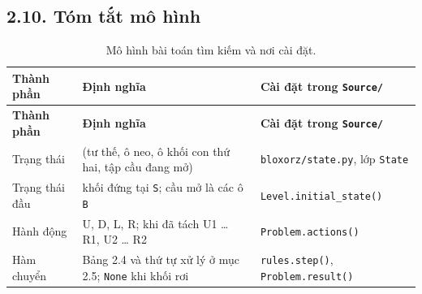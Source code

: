 \subsection{2.10. Tóm tắt mô hình}


\begin{longtable}[]{@{}
  >{\raggedright\arraybackslash}p{}
  >{\raggedright\arraybackslash}p{}
  >{\raggedright\arraybackslash}p{}@{}}
\caption{ Mô hình bài toán tìm kiếm và nơi cài đặt.}\tabularnewline
\toprule\noalign{}
\rowcolor{tablehead}\begin{minipage}[b]{\linewidth}\raggedright
\textbf{Thành phần}
\end{minipage} & \begin{minipage}[b]{\linewidth}\raggedright
\textbf{Định nghĩa}
\end{minipage} & \begin{minipage}[b]{\linewidth}\raggedright
\textbf{Cài đặt trong \texttt{Source/\allowbreak{}}}
\end{minipage} \\
\midrule\noalign{}
\endfirsthead
\toprule\noalign{}
\rowcolor{tablehead}\begin{minipage}[b]{\linewidth}\raggedright
\textbf{Thành phần}
\end{minipage} & \begin{minipage}[b]{\linewidth}\raggedright
\textbf{Định nghĩa}
\end{minipage} & \begin{minipage}[b]{\linewidth}\raggedright
\textbf{Cài đặt trong \texttt{Source/\allowbreak{}}}
\end{minipage} \\
\midrule\noalign{}
\endhead
\bottomrule\noalign{}
\endlastfoot
Trạng thái & (tư thế, ô neo, ô khối con thứ hai, tập cầu đang mở) & \texttt{bloxorz/\allowbreak{}state.\allowbreak{}py}, lớp \texttt{State} \\
\rowrule
Trạng thái đầu & khối đứng tại \texttt{S}; cầu mở là các ô \texttt{B} & \texttt{Level.\allowbreak{}initial\_\allowbreak{}state()} \\
\rowrule
Hành động & U, D, L, R; khi đã tách U1 \ldots{} R1, U2 \ldots{} R2 & \texttt{Problem.\allowbreak{}actions()} \\
\rowrule
Hàm chuyển & Bảng 2.4 và thứ tự xử lý ở mục 2.5; \texttt{None} khi khối rơi & \texttt{rules.\allowbreak{}step()}, \texttt{Problem.\allowbreak{}result()} \\

\end{longtable}
